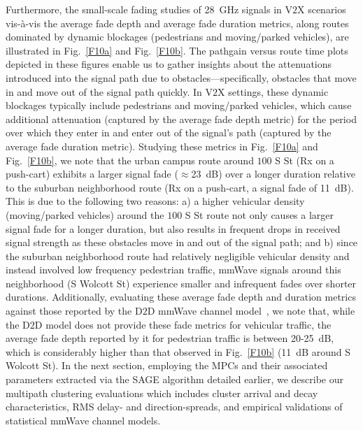 \documentclass[10pt, twocolumn]{IEEEtran}
\begin{document}
{Furthermore, the small-scale fading studies of \SI{28}{\giga\hertz} signals in V$2$X scenarios vis-à-vis the average fade depth and average fade duration metrics, along routes dominated by dynamic blockages (pedestrians and moving/parked vehicles), are illustrated in Fig.~\ref{F10a} and Fig.~\ref{F10b}. The pathgain versus route time plots depicted in these figures enable us to gather insights about the attenuations introduced into the signal path due to obstacles---specifically, obstacles that move in and move out of the signal path quickly. In V$2$X settings, these dynamic blockages typically include pedestrians and moving/parked vehicles, which cause additional attenuation (captured by the average fade depth metric) for the period over which they enter in and enter out of the signal's path (captured by the average fade duration metric). Studying these metrics in Fig.~\ref{F10a} and Fig.~\ref{F10b}, we note that the urban campus route around $100$ S St (Rx on a push-cart) exhibits a larger signal fade (${\approx}$\SI{23}{\deci\bel}) over a longer duration relative to the suburban neighborhood route (Rx on a push-cart, a signal fade of \SI{11}{\deci\bel}). This is due to the following two reasons: a) a higher vehicular density (moving/parked vehicles) around the $100$ S St route not only causes a larger signal fade for a longer duration, but also results in frequent drops in received signal strength as these obstacles move in and out of the signal path; and b) since the suburban neighborhood route had relatively negligible vehicular density and instead involved low frequency pedestrian traffic, mmWave signals around this neighborhood (S Wolcott St) experience smaller and infrequent fades over shorter durations. Additionally, evaluating these average fade depth and duration metrics against those reported by the D$2$D mmWave channel model~\cite{D2DHumanBlockage}, we note that, while the D$2$D model does not provide these fade metrics for vehicular traffic, the average fade depth reported by it for pedestrian traffic is between \SI{20}{}-\SI{25}{\deci\bel}, which is considerably higher than that observed in Fig.~\ref{F10b} (\SI{11}{\deci\bel} around S Wolcott St). In the next section, employing the MPCs and their associated parameters extracted via the SAGE algorithm detailed earlier, we describe our multipath clustering evaluations which includes cluster arrival and decay characteristics, RMS delay- and direction-spreads, and empirical validations of statistical mmWave channel models.
\vspace{-3mm}

}
\end{document}
